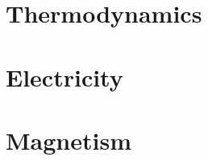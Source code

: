 \documentclass[
  12pt, %
  letterpaper,
]{LegrandOrangeBook}
\begin{document}


%
%
%
%
%
%
%
%
%
%
%
%
%
%
%
%
%
%
%
%
%
%
%


\part{Thermodynamics}




\part{Electricity}






\part{Magnetism}



\end{document}
